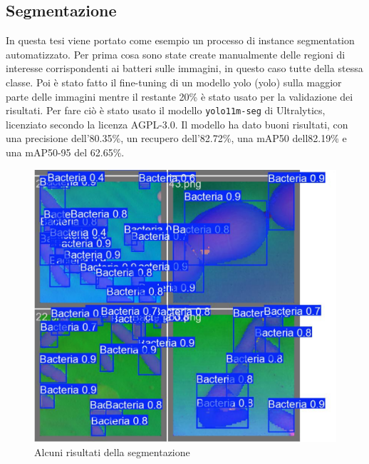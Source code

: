 \documentclass[../main.tex]{subfiles}
\begin{document}
\subsection{Segmentazione}

In questa tesi viene portato come esempio un processo di instance segmentation automatizzato.\cite{hafiz_2020} Per prima cosa sono state create manualmente delle regioni di interesse corrispondenti ai batteri sulle immagini, in questo caso tutte della stessa classe. Poi è stato fatto il fine-tuning di un modello \acrshort{yolo} (\acrlong{yolo}) sulla maggior parte delle immagini mentre il restante 20\% è stato usato per la validazione dei risultati. Per fare ciò è stato usato il modello \texttt{yolo11m-seg} di Ultralytics\cite{ultralytics_2023}, licenziato secondo la licenza AGPL-3.0. Il modello ha dato buoni risultati, con una precisione dell'80.35\%, un recupero dell'82.72\%, una mAP50 dell82.19\% e una mAP50-95 del 62.65\%.

\begin{figure}[h]
	\includegraphics[keepaspectratio,width=\linewidth]{images/seg_val.png}
	\caption{Alcuni risultati della segmentazione}
\end{figure}
\end{document}
